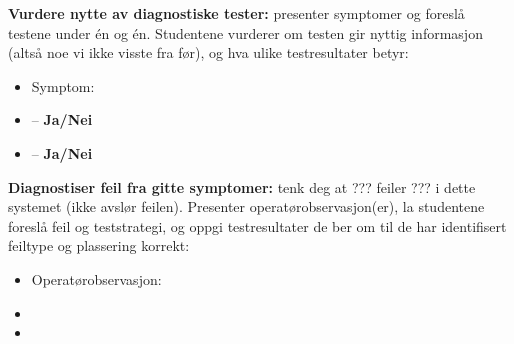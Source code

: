 \vskip 10pt


\noindent
{\bf Vurdere nytte av diagnostiske tester:} presenter symptomer og foreslå testene under én og én. Studentene vurderer om testen gir nyttig informasjon (altså noe vi ikke visste fra før), og hva ulike testresultater betyr:

\begin{itemize}
\item{} Symptom: {\it }
\item{}  -- {\bf Ja/Nei}
\item{}  -- {\bf Ja/Nei}
\end{itemize}


\vskip 10pt


\noindent
{\bf Diagnostiser feil fra gitte symptomer:} tenk deg at ??? feiler ??? i dette systemet (ikke avslør feilen). Presenter operatørobservasjon(er), la studentene foreslå feil og teststrategi, og oppgi testresultater de ber om til de har identifisert feiltype og plassering korrekt:

\begin{itemize}
\item{} Operatørobservasjon: {\it }
\item{}
\item{}
\end{itemize}

